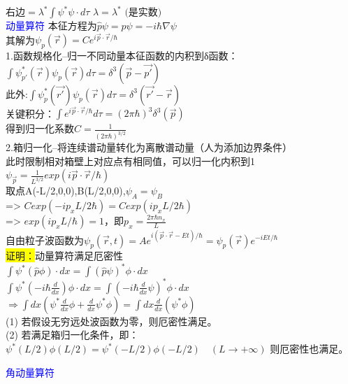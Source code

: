 \documentclass[a4paper,8pt]{extarticle} %
\newcommand{\bluetext}[1]{\textcolor{blue}{#1}}
\newcommand{\yellowback}[1]{\colorbox{yellow}{#1}}
\begin{document}
\begin{multicols}{3}
$\text{右边} = \lambda^*\int \psi^*\psi\cdot d\tau$
$\lambda = \lambda^* \text{ (是实数)}$\\
\bluetext{动量算符}
本征方程为$\hat{p}\psi = p\psi=-i\hbar\nabla\psi$\\
其解为$\psi_p(\vec{r}) = Ce^{i\vec{p}\cdot\vec{r}/\hbar}$\\
1.函数规格化--归一不同动量本征函数的内积到δ函数：\\
$\int\psi^*_{p'}(\vec{r})\psi_{p}(\vec{r})d\tau = \delta^3(\vec{p}-\vec{p'})$\\
此外:$\int\psi^*_{p}(\vec{r'})\psi_{p}(\vec{r})d\tau = \delta^3(\vec{r'}-\vec{r})$\\
关键积分：$\int e^{i\vec{p}\cdot\vec{r}/\hbar}d\tau = (2\pi\hbar)^3\delta^3(\vec{p})$\\
得到归一化系数$C = \frac{1}{(2\pi\hbar)^{3/2}}$\\
2.箱归一化--将连续谱动量转化为离散谱动量（人为添加边界条件）\\
此时限制相对箱壁上对应点有相同值，可以归一化内积到1\\
$\psi_{\vec{p}}=\frac{1}{L^{3/2}}exp(i\vec{p}\cdot\vec{r}/\hbar)$\\
取点A(-L/2,0,0),B(L/2,0,0),$\psi_A=\psi_B$\\
=> $Cexp(-ip_xL/2\hbar)=Cexp(ip_xL/2\hbar)$\\
=> $exp(ip_xL/\hbar)=1$，即$p_x=\frac{2\pi\hbar n_x}{L}$\\
自由粒子波函数为$\psi_p(\vec{r},t)=Ae^{i(\vec{p}\cdot\vec{r}-Et)/\hbar}=\psi_p(\vec{r})e^{-iEt/\hbar}$\\
\yellowback{证明：}动量算符满足厄密性\\
$\int \psi^*(\hat{p}\phi)\cdot dx = \int(\hat{p}\psi)^*\phi\cdot dx$\\
$\int \psi^*(-i\hbar\frac{d}{dx})\phi\cdot dx = \int(-i\hbar\frac{d}{dx}\psi)^*\phi\cdot dx$\\
$\Rightarrow \int dx(\psi^*\frac{d}{dx}\phi + \frac{d}{dx}\psi^*\phi) = \int dx\frac{d}{dx}(\psi^*\phi)$\\
(1) 若假设无穷远处波函数为零，则厄密性满足。\\
(2) 若满足箱归一化条件，即：\\
$\psi^*(L/2)\phi(L/2) = \psi^*(-L/2)\phi(-L/2) \quad (L \rightarrow +\infty)$
则厄密性也满足。

\bluetext{角动量算符}


\end{multicols}
\end{document}
